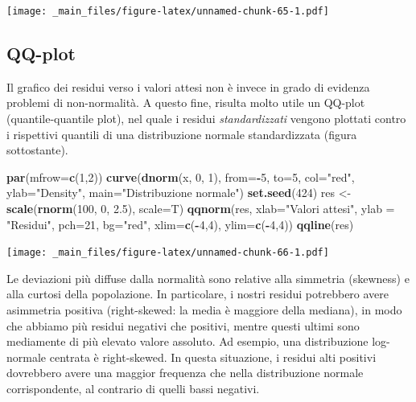 \documentclass[a4paper,12pt,oneside]{book}
\newenvironment{Shaded}{\begin{snugshade}}{\end{snugshade}}
\newcommand{\KeywordTok}[1]{\textcolor[rgb]{0.13,0.29,0.53}{\textbf{#1}}}
\newcommand{\DataTypeTok}[1]{\textcolor[rgb]{0.13,0.29,0.53}{#1}}
\newcommand{\DecValTok}[1]{\textcolor[rgb]{0.00,0.00,0.81}{#1}}
\newcommand{\FloatTok}[1]{\textcolor[rgb]{0.00,0.00,0.81}{#1}}
\newcommand{\StringTok}[1]{\textcolor[rgb]{0.31,0.60,0.02}{#1}}
\newcommand{\OperatorTok}[1]{\textcolor[rgb]{0.81,0.36,0.00}{\textbf{#1}}}
\newcommand{\NormalTok}[1]{#1}
\theoremstyle{definition}
\theoremstyle{definition}
\theoremstyle{definition}
\theoremstyle{remark}
\begin{document}
\texttt{[image: \_main\_files/figure-latex/unnamed-chunk-65-1.pdf]}

\subsection{QQ-plot}\label{qq-plot}

Il grafico dei residui verso i valori attesi non è invece in grado di
evidenza problemi di non-normalità. A questo fine, risulta molto utile
un QQ-plot (quantile-quantile plot), nel quale i residui
\emph{standardizzati} vengono plottati contro i rispettivi quantili di
una distribuzione normale standardizzata (figura sottostante).

\begin{Shaded}
\begin{Highlighting}[]
\KeywordTok{par}\NormalTok{(}\DataTypeTok{mfrow=}\KeywordTok{c}\NormalTok{(}\DecValTok{1}\NormalTok{,}\DecValTok{2}\NormalTok{))}
\KeywordTok{curve}\NormalTok{(}\KeywordTok{dnorm}\NormalTok{(x, }\DecValTok{0}\NormalTok{, }\DecValTok{1}\NormalTok{), }\DataTypeTok{from=}\OperatorTok{-}\DecValTok{5}\NormalTok{, }\DataTypeTok{to=}\DecValTok{5}\NormalTok{, }\DataTypeTok{col=}\StringTok{"red"}\NormalTok{,}
      \DataTypeTok{ylab=}\StringTok{"Density"}\NormalTok{, }\DataTypeTok{main=}\StringTok{"Distribuzione normale"}\NormalTok{)}
\KeywordTok{set.seed}\NormalTok{(}\DecValTok{424}\NormalTok{)}
\NormalTok{res <-}\StringTok{ }\KeywordTok{scale}\NormalTok{(}\KeywordTok{rnorm}\NormalTok{(}\DecValTok{100}\NormalTok{, }\DecValTok{0}\NormalTok{, }\FloatTok{2.5}\NormalTok{), }\DataTypeTok{scale=}\NormalTok{T)}
\KeywordTok{qqnorm}\NormalTok{(res, }\DataTypeTok{xlab=}\StringTok{"Valori attesi"}\NormalTok{, }
     \DataTypeTok{ylab =} \StringTok{"Residui"}\NormalTok{, }\DataTypeTok{pch=}\DecValTok{21}\NormalTok{, }\DataTypeTok{bg=}\StringTok{"red"}\NormalTok{, }\DataTypeTok{xlim=}\KeywordTok{c}\NormalTok{(}\OperatorTok{-}\DecValTok{4}\NormalTok{,}\DecValTok{4}\NormalTok{),}
     \DataTypeTok{ylim=}\KeywordTok{c}\NormalTok{(}\OperatorTok{-}\DecValTok{4}\NormalTok{,}\DecValTok{4}\NormalTok{))}
\KeywordTok{qqline}\NormalTok{(res)}
\end{Highlighting}
\end{Shaded}

\texttt{[image: \_main\_files/figure-latex/unnamed-chunk-66-1.pdf]}

Le deviazioni più diffuse dalla normalità sono relative alla simmetria
(skewness) e alla curtosi della popolazione. In particolare, i nostri
residui potrebbero avere asimmetria positiva (right-skewed: la media è
maggiore della mediana), in modo che abbiamo più residui negativi che
positivi, mentre questi ultimi sono mediamente di più elevato valore
assoluto. Ad esempio, una distribuzione log-normale centrata è
right-skewed. In questa situazione, i residui alti positivi dovrebbero
avere una maggior frequenza che nella distribuzione normale
corrispondente, al contrario di quelli bassi negativi.
\end{document}
